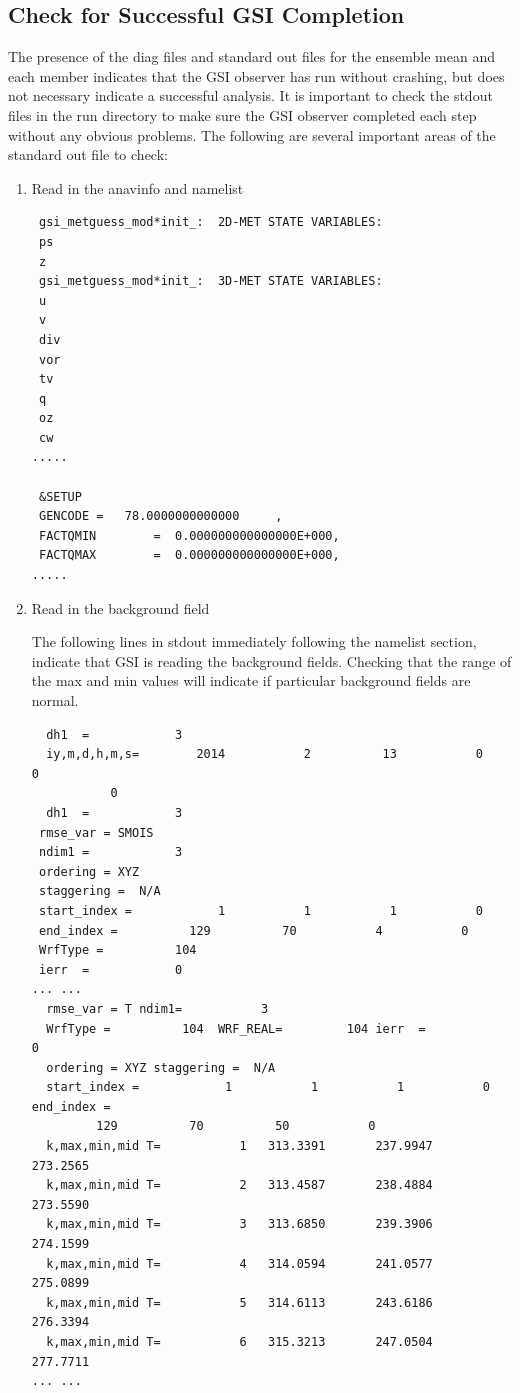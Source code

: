\subsection{Check for Successful GSI Completion}

The presence of the diag files and standard out files for the ensemble mean and each member indicates that the GSI observer has run without crashing, but does not necessary indicate a successful analysis. It is important to check the stdout files in the run directory to make sure the GSI observer completed each step without any obvious problems. The following are several important areas of the standard out file to check:
\begin{enumerate}
\item Read in the anavinfo and namelist
\begin{footnotesize}
\begin{verbatim}
 gsi_metguess_mod*init_:  2D-MET STATE VARIABLES:
 ps
 z
 gsi_metguess_mod*init_:  3D-MET STATE VARIABLES:
 u
 v
 div
 vor
 tv
 q
 oz
 cw
.....

 &SETUP
 GENCODE =   78.0000000000000     ,
 FACTQMIN        =  0.000000000000000E+000,
 FACTQMAX        =  0.000000000000000E+000,
.....
\end{verbatim}
\end{footnotesize}

\item Read in the background field

The following lines in stdout immediately following the namelist section, indicate that GSI is reading the background fields. Checking that the range of the max and min values will indicate if particular background fields are normal.

\begin{footnotesize}
\begin{verbatim}
  dh1  =            3
  iy,m,d,h,m,s=        2014           2          13           0           0
           0
  dh1  =            3
 rmse_var = SMOIS
 ndim1 =            3
 ordering = XYZ
 staggering =  N/A
 start_index =            1           1           1           0
 end_index =          129          70           4           0
 WrfType =          104
 ierr  =            0
... ...
  rmse_var = T ndim1=           3
  WrfType =          104  WRF_REAL=         104 ierr  =            0
  ordering = XYZ staggering =  N/A
  start_index =            1           1           1           0  end_index =
         129          70          50           0
  k,max,min,mid T=           1   313.3391       237.9947       273.2565
  k,max,min,mid T=           2   313.4587       238.4884       273.5590
  k,max,min,mid T=           3   313.6850       239.3906       274.1599
  k,max,min,mid T=           4   314.0594       241.0577       275.0899
  k,max,min,mid T=           5   314.6113       243.6186       276.3394
  k,max,min,mid T=           6   315.3213       247.0504       277.7711
... ...
\end{verbatim}
\end{footnotesize}


\end{enumerate}
